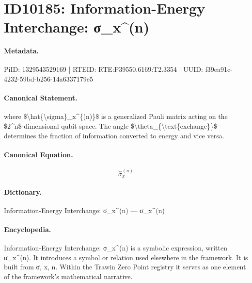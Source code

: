 \section*{ID10185: Information-Energy Interchange: σ\_x\textasciicircum{}(n)}
\paragraph{Metadata.}
PiID: 1329543529169 | RTEID: RTE:P39550.6169:T2.3354 | UUID: f39ea91c-4232-59bd-b256-14a6337179e5

\paragraph{Canonical Statement.}
where \$\textbackslash{}hat\{\textbackslash{}sigma\}\_x\textasciicircum{}\{(n)\}\$ is a generalized Pauli matrix acting on the \$2\textasciicircum{}n\$-dimensional qubit space. The angle \$\textbackslash{}theta\_\{\textbackslash{}text\{exchange\}\}\$ determines the fraction of information converted to energy and vice versa.

\paragraph{Canonical Equation.}
\[
\hat{\sigma}_x^{(n)}
\]

\paragraph{Dictionary.}
Information-Energy Interchange: σ\_x\textasciicircum{}(n) — σ\_x\textasciicircum{}(n)

\paragraph{Encyclopedia.}
Information-Energy Interchange: σ\_x\textasciicircum{}(n) is a symbolic expression, written σ\_x\textasciicircum{}(n). It introduces a symbol or relation used elsewhere in the framework. It is built from σ, x, n. Within the Trawin Zero Point registry it serves as one element of the framework's mathematical narrative.
